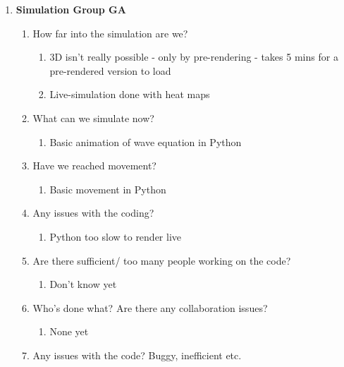 \begin{enumerate}
\item  \textbf{Simulation Group GA}

\begin{enumerate}
\item How far into the simulation are we?

\begin{enumerate}
\item  3D isn't really possible - only by pre-rendering - takes 5 mins for a pre-rendered version to load

\item  Live-simulation done with heat maps
\end{enumerate}

\item  What can we simulate now?

\begin{enumerate}
\item  Basic animation of wave equation in Python
\end{enumerate}

\item  Have we reached movement?

\begin{enumerate}
\item  Basic movement in Python
\end{enumerate}

\item  Any issues with the coding? 

\begin{enumerate}
\item  Python too slow to render live
\end{enumerate}

\item  Are there sufficient/ too many people working on the code? 

\begin{enumerate}
\item  Don't know yet
\end{enumerate}

\item  Who's done what? Are there any collaboration issues? 

\begin{enumerate}
\item  None yet
\end{enumerate}

\item  Any issues with the code? Buggy, inefficient etc. 


\end{enumerate}
\end{enumerate}
